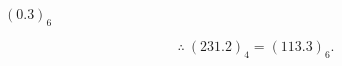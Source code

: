 \begin{minipage}{\linewidth}
\begin{minipage}[t]{.48\linewidth}
$ (0.3)_{6} $
\end{minipage}\par
\[\therefore\ (231.2)_{4}=(113.3)_{6}.\]
\end{minipage}\par
